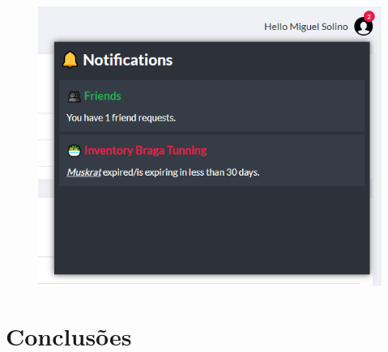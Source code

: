 \documentclass[a4paper]{report}
\begin{document}
    \begin{figure}[H]
        \centering
            \includegraphics[width=\textwidth]{images/produto_final/notificacoes.png}
    \end{figure}

\chapter{Conclusões}
\end{document}
